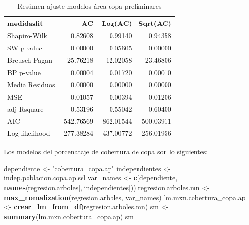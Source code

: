 \documentclass[12pt,]{book}
\newenvironment{Shaded}{\begin{snugshade}}{\end{snugshade}}
\newcommand{\KeywordTok}[1]{\textcolor[rgb]{0.13,0.29,0.53}{\textbf{#1}}}
\newcommand{\StringTok}[1]{\textcolor[rgb]{0.31,0.60,0.02}{#1}}
\newcommand{\NormalTok}[1]{#1}
\begin{document}
\begin{table}

\caption{\label{tab:comp-lmcopa}Resúmen ajuste modelos área copa preliminares}
\centering
\begin{tabular}[t]{l|r|r|r}
\hline
medidasfit & AC & Log(AC) & Sqrt(AC)\\
\hline
Shapiro-Wilk & 0.82608 & 0.99140 & 0.94358\\
\hline
SW p-value & 0.00000 & 0.05605 & 0.00000\\
\hline
Breusch-Pagan & 25.76218 & 12.02058 & 23.46806\\
\hline
BP p-value & 0.00004 & 0.01720 & 0.00010\\
\hline
Media Residuos & 0.00000 & 0.00000 & 0.00000\\
\hline
MSE & 0.01057 & 0.00394 & 0.01206\\
\hline
adj-Rsquare & 0.53196 & 0.55042 & 0.60400\\
\hline
AIC & -542.76569 & -862.01544 & -500.03911\\
\hline
Log likelihood & 277.38284 & 437.00772 & 256.01956\\
\hline
\end{tabular}
\end{table}

Los modelos del porcenataje de cobertura de copa son lo siguientes:

\begin{Shaded}
\begin{Highlighting}[]
\NormalTok{dependiente <-}\StringTok{ "cobertura_copa.ap"}
\NormalTok{independientes <-}\StringTok{ }\NormalTok{indep.poblacion.copa.ap.sel}
\NormalTok{var_names <-}\StringTok{ }\KeywordTok{c}\NormalTok{(dependiente, }\KeywordTok{names}\NormalTok{(regresion.arboles[, independientes]))}
\NormalTok{regresion.arboles.mn <-}\StringTok{ }\KeywordTok{max_nomalization}\NormalTok{(regresion.arboles, var_names)}
\NormalTok{lm.mxn.cobertura_copa.ap <-}\StringTok{ }\KeywordTok{crear_lm_from_df}\NormalTok{(regresion.arboles.mn)}
\NormalTok{sm <-}\StringTok{ }\KeywordTok{summary}\NormalTok{(lm.mxn.cobertura_copa.ap)}
\NormalTok{sm}
\end{Highlighting}
\end{Shaded}
\end{document}
